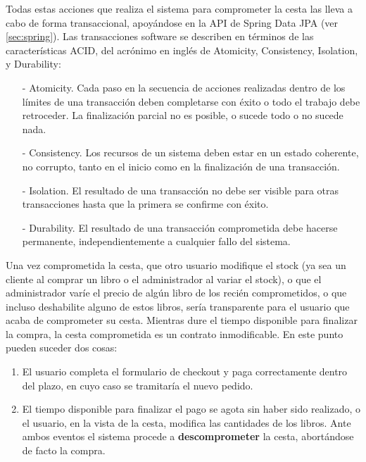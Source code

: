 \documentclass[a4paper]{article}
\begin{document}
    Todas estas acciones que realiza el sistema para comprometer la cesta las lleva a cabo de forma transaccional, apoyándose en la API de Spring Data JPA (ver \ref{sec:spring}). Las transacciones software se describen en términos de las características ACID, del acrónimo en inglés de Atomicity, Consistency, Isolation, y Durability:
    
    \begin{itemize}
    	\item[-] Atomicity. Cada paso en la secuencia de acciones realizadas dentro de los límites de una transacción deben completarse con éxito o todo el trabajo debe
    	retroceder. La finalización parcial no es posible, o sucede todo o no sucede nada.
    	\item[-] Consistency. Los recursos de un sistema deben estar en un estado coherente, no corrupto, tanto en el inicio como en la finalización de una transacción.
    	\item[-] Isolation. El resultado de una transacción no debe ser visible para otras transacciones hasta que la primera se confirme con éxito.
    	\item[-] Durability. El resultado de una transacción comprometida debe hacerse permanente, independientemente a cualquier fallo del sistema.
    \end{itemize}
    
    Una vez comprometida la cesta, que otro usuario modifique el stock (ya sea un cliente al comprar un libro o el administrador al variar el stock), o que el administrador varíe el precio de algún libro de los recién comprometidos, o que incluso deshabilite alguno de estos libros, sería transparente para el usuario que acaba de comprometer su cesta. Mientras dure el tiempo disponible para finalizar la compra, la cesta comprometida es un contrato inmodificable. En este punto pueden suceder dos cosas: 
    
    \begin{enumerate}
    	\item El usuario completa el formulario de checkout y paga correctamente dentro del plazo, en cuyo caso se tramitaría el nuevo pedido.
    	\item El tiempo disponible para finalizar el pago se agota sin haber sido realizado, o el usuario, en la vista de la cesta, modifica las cantidades de los libros. Ante ambos eventos el sistema procede a \textbf{descomprometer} la cesta, abortándose de facto la compra.
    \end{enumerate}
    
\end{document}
